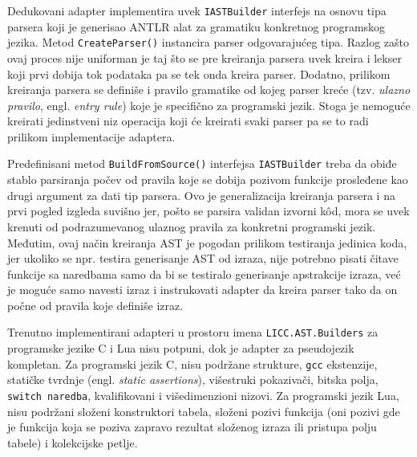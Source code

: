 Dedukovani adapter implementira uvek \texttt{IASTBuilder} interfejs na osnovu tipa parsera koji je generisao ANTLR alat za gramatiku konkretnog programskog jezika. Metod \texttt{CreateParser()} instancira parser odgovarajućeg tipa. Razlog zašto ovaj proces nije uniforman je taj što se pre kreiranja parsera uvek kreira i lekser koji prvi dobija tok podataka pa se tek onda kreira parser. Dodatno, prilikom kreiranja parsera se definiše i pravilo gramatike od kojeg parser kreće (tzv. \emph{ulazno pravilo}, engl. \emph{entry rule}) koje je specifično za programski jezik. Stoga je nemoguće kreirati jedinstveni niz operacija koji će kreirati svaki parser pa se to radi prilikom implementacije adaptera. 

Predefinisani metod \texttt{BuildFromSource()} interfejsa \texttt{IASTBuilder} treba da obiđe stablo parsiranja počev od pravila koje se dobija pozivom funkcije prosleđene kao drugi argument za dati tip parsera. Ovo je generalizacija kreiranja parsera i na prvi pogled izgleda suvišno jer, pošto se parsira validan izvorni k\^od, mora se uvek krenuti od podrazumevanog ulaznog pravila za konkretni programski jezik. Međutim, ovaj način kreiranja AST je pogodan prilikom testiranja jedinica koda, jer ukoliko se npr. testira generisanje AST od izraza, nije potrebno pisati čitave funkcije sa naredbama samo da bi se testiralo generisanje apstrakcije izraza, već je moguće samo navesti izraz i instrukovati adapter da kreira parser tako da on počne od pravila koje definiše izraz.

Trenutno implementirani adapteri u prostoru imena \texttt{LICC.AST.Builders} za programske jezike C i Lua nisu potpuni, dok je adapter za pseudojezik kompletan. Za programski jezik C, nisu podr\v{z}ane strukture, \texttt{gcc} ekstenzije, stati\v{c}ke tvrdnje (engl. \emph{static assertions}), vi\v{s}estruki pokaziva\v{c}i, bitska polja, \texttt{switch naredba}, kvalifikovani i vi\v{s}edimenzioni nizovi. Za programski jezik Lua, nisu podr\v{z}ani slo\v{z}eni konstruktori tabela, slo\v{z}eni pozivi funkcija (oni pozivi gde je funkcija koja se poziva zapravo rezultat slo\v{z}enog izraza ili pristupa polju tabele) i kolekcijske petlje.

